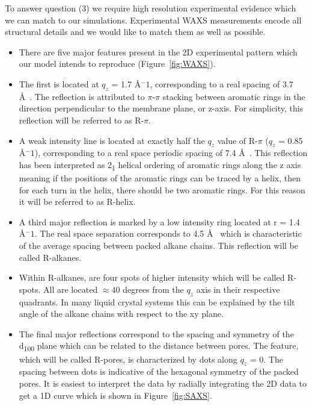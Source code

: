 \documentclass{article}
\newcommand{\angstrom}{\textup{\AA}}
\begin{document}
  To answer question (3) we require high resolution experimental evidence which we 
  can match to our simulations. Experimental WAXS measurements encode all structural
  details and we would like to match them as well as possible. 
  \begin{itemize}
  	\item There are five major features present in the 2D experimental 
	pattern which our model intends to reproduce (Figure~\ref{fig:WAXS}).
	\item The first is located at $q_z$ = 1.7 \angstrom$^-1$,
	corresponding to a real spacing of 3.7 \angstrom~. The reflection is 
	attributed to $\pi$-$\pi$ stacking between aromatic rings in the direction
	perpendicular to the membrane plane, or z-axis. For simplicity, this 
	reflection will be referred to as R-$\pi$.
	\item A weak intensity line is located at exactly half the $q_z$ value of
	R-$\pi$ ($q_z$ = 0.85 \angstrom$^-1$), corresponding to a 
	real space periodic spacing of 7.4 \angstrom~. This reflection has been 
	interpreted  as 2\textsubscript{1} helical ordering of aromatic rings 
	along the z axis meaning if the positions of the aromatic rings can
	be traced by a helix, then for each turn in the helix, there should be
	two aromatic rings. For this reason it will be referred to as R-helix.
	\item A third major reflection is marked by a low intensity ring located
	at r = 1.4 \angstrom$^-1$. The real space separation 
	corresponds to 4.5 \angstrom~ which is characteristic of the average 
	spacing between packed alkane chains. This reflection will be called R-alkanes.
	\item Within R-alkanes, are four spots of higher intensity which 
	will be called R-spots. All are located $\approx 40$ degrees from the $q_z$ axis
	in their respective quadrants. In many liquid crystal systems this can be
	explained by the tilt angle of the alkane chains with respect to the xy plane. %
	\item The final major reflections correspond to the spacing and symmetry of 
	the d\textsubscript{100} plane which can be related to the distance between
	pores. The feature, which will be called R-pores, is characterized by dots 
	along $q_z$ = 0. The spacing between dots is indicative of the hexagonal 
	symmetry of the packed pores. It is easiest to interpret the data by 
	radially integrating the 2D data to get a 1D curve which is shown in Figure~\ref{fig:SAXS}.
  \end{itemize}
\end{document}
